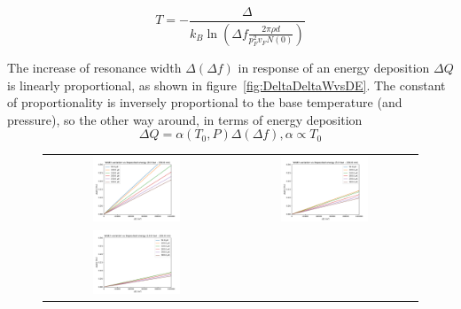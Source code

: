 \documentclass[a4paper,10pt]{article}
\begin{document}
\begin{equation}
T = - \frac{\Delta}{k_B \ln \left( \Delta f \frac{2 \pi \rho d}{p_F^2 v_F N(0)} \right)}
\end{equation}

The increase of resonance width $\Delta (\Delta f)$ in response of an energy deposition $\Delta Q$ is linearly proportional, as shown in figure~\ref{fig:DeltaDeltaWvsDE}.
The constant of proportionality is inversely proportional to the base temperature (and pressure), so the other way around, in terms of energy deposition
\begin{equation}
  \Delta Q = \alpha(T_0,P) \Delta (\Delta f), \alpha \propto T_0
    \label{eq:alpha}
\end{equation}

\begin{figure}[!ht]
  \begin{center}
  \begin{tabular}{cc}
    \includegraphics[width=0.49\textwidth]{DeltaDeltaW_vs_DE-0bar}  &
    \includegraphics[width=0.49\textwidth]{DeltaDeltaW_vs_DE-5bar}  \\
    \includegraphics[width=0.49\textwidth]{DeltaDeltaW_vs_DE-10bar} &

\end{tabular}
\end{center}
\end{figure}
\end{document}
